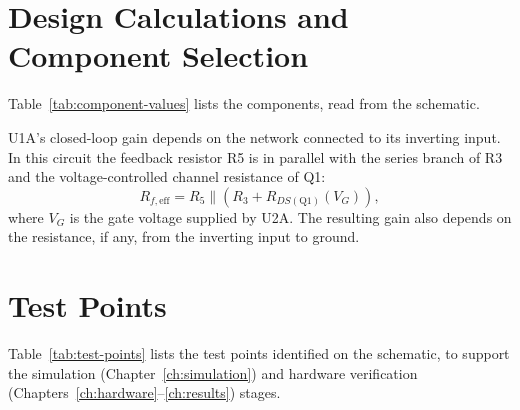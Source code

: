 

\section{Design Calculations and Component Selection}

Table~\ref{tab:component-values} lists the components, read from the schematic.



U1A's closed-loop gain depends on the network connected to its inverting input. In this circuit the feedback resistor R5 is in parallel with the series branch of R3 and the voltage-controlled channel resistance of Q1:
\begin{equation}
    R_{f,\mathrm{eff}} = R_5 \parallel \left(R_3 + R_{DS(\mathrm{Q1})}(V_G)\right),
    \label{eq:u1a_gain}
\end{equation}
where $V_G$ is the gate voltage supplied by U2A. The resulting gain also depends on the resistance, if any, from the inverting input to ground.



\section{Test Points}

Table~\ref{tab:test-points} lists the test points identified on the schematic, to support the simulation (Chapter~\ref{ch:simulation}) and hardware verification (Chapters~\ref{ch:hardware}--\ref{ch:results}) stages.


